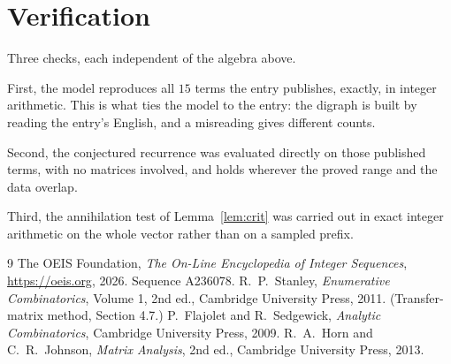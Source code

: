 \documentclass[11pt,a4paper]{article}
\theoremstyle{plain}
\theoremstyle{definition}
\begin{document}
\section{Verification}

Three checks, each independent of the algebra above.

First, the model reproduces all $15$ terms the entry publishes, exactly, in integer
arithmetic. This is what ties the model to the entry: the digraph is built by reading the
entry's English, and a misreading gives different counts.

Second, the conjectured recurrence was evaluated directly on those published terms, with no
matrices involved, and holds wherever the proved range and the data overlap.

Third, the annihilation test of Lemma~\ref{lem:crit} was carried out in exact integer
arithmetic on the whole vector rather than on a sampled prefix.

\begin{thebibliography}{9}
 The OEIS Foundation, \emph{The On-Line Encyclopedia of Integer
Sequences}, \url{https://oeis.org}, 2026. Sequence A236078.
 R.~P.~Stanley, \emph{Enumerative Combinatorics}, Volume 1, 2nd ed.,
Cambridge University Press, 2011. (Transfer-matrix method, Section 4.7.)
 P.~Flajolet and R.~Sedgewick, \emph{Analytic Combinatorics}, Cambridge
University Press, 2009.
 R.~A.~Horn and C.~R.~Johnson, \emph{Matrix Analysis}, 2nd ed., Cambridge
University Press, 2013.
\end{thebibliography}
\end{document}
